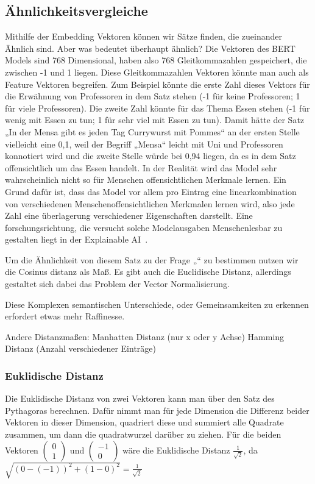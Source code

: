 \subsection{Ähnlichkeitsvergleiche}

Mithilfe der Embedding Vektoren können wir Sätze finden, die zueinander Ähnlich sind. 
Aber was bedeutet überhaupt ähnlich? 
Die Vektoren des BERT Models sind 768 Dimensional, haben also 768 Gleitkommazahlen gespeichert, die zwischen -1 und 1 liegen. 
Diese Gleitkommazahlen Vektoren könnte man auch als Feature Vektoren begreifen. 
Zum Beispiel könnte die erste Zahl dieses Vektors für die Erwähnung von Professoren in dem Satz stehen (-1 für keine Professoren; 1 für viele Professoren). 
Die zweite Zahl könnte für das Thema Essen stehen (-1 für wenig mit Essen zu tun; 1 für sehr viel mit Essen zu tun). 
Damit hätte der Satz „In der Mensa gibt es jeden Tag Currywurst mit Pommes“ an der ersten Stelle vielleicht eine 0,1, weil der Begriff „Mensa“ leicht mit Uni und Professoren konnotiert wird und die zweite Stelle würde bei 0,94 liegen, da es in dem Satz offensichtlich um das Essen handelt. 
In der Realität wird das Model sehr wahrscheinlich nicht so für Menschen offensichtlichen Merkmale lernen. Ein Grund dafür ist, dass das Model vor allem pro Eintrag eine linearkombination von verschiedenen Menschenoffensichtlichen Merkmalen lernen wird, also jede Zahl eine überlagerung verschiedener Eigenschaften darstellt. 
Eine forschungsrichtung, die versucht solche Modelausgaben Menschenlesbar zu gestalten liegt in der Explainable AI~\cite{hassija2024}.

Um die Ähnlichkeit von diesem Satz zu der Frage „“ zu bestimmen nutzen wir die Cosinus distanz als Maß. 
Es gibt auch die Euclidische Distanz, allerdings gestaltet sich dabei das Problem der Vector Normalisierung.


Diese Komplexen semantischen Unterschiede, oder Gemeinsamkeiten zu erkennen erfordert etwas mehr Raffinesse.

Andere Distanzmaßen:
Manhatten Distanz (nur x oder y Achse)
Hamming Distanz (Anzahl verschiedener Einträge)

\subsubsection{Euklidische Distanz}

Die Euklidische Distanz von zwei Vektoren kann man über den Satz des Pythagoras berechnen.
Dafür nimmt man für jede Dimension die Differenz beider Vektoren in dieser Dimension, quadriert diese und summiert alle Quadrate zusammen, um dann die quadratwurzel darüber zu ziehen.
Für die beiden Vektoren 
$\begin{pmatrix}0\\1\end{pmatrix}$
und 
$\begin{pmatrix}-1\\0\end{pmatrix}$
wäre die Euklidische Distanz 
$\frac{1}{\sqrt{2}}$, da $\sqrt{(0-(-1))^2 + (1-0)^2}=\frac{1}{\sqrt{2}}$

